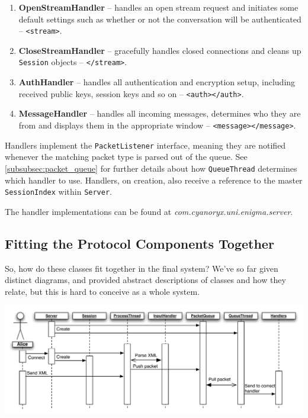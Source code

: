     \begin{enumerate}
      \item \textbf{OpenStreamHandler} -- handles an open stream request and initiates some default settings such as whether or not the conversation will be authenticated -- \verb!<stream>!.
      \item \textbf{CloseStreamHandler} -- gracefully handles closed connections and cleans up \verb!Session! objects -- \verb!</stream>!.
      \item \textbf{AuthHandler} -- handles all authentication and encryption setup, including received public keys, session keys and so on -- \verb!<auth></auth>!.
      \item \textbf{MessageHandler} -- handles all incoming messages, determines who they are from and displays them in the appropriate window -- \verb!<message></message>!.
    \end{enumerate}
    
    Handlers implement the \verb!PacketListener! interface, meaning they are notified whenever the matching packet type is parsed out of the queue. See \textsection\ref{subsubsec:packet_queue} for further details about how \verb!QueueThread! determines which handler to use. Handlers, on creation, also receive a reference to the master \verb!SessionIndex! within \verb!Server!.
    
    The handler implementations can be found at \emph{com.cyanoryx.uni.enigma.server}.
    
    \subsection{Fitting the Protocol Components Together}
    \label{subsec:combined}
    
    So, how do these classes fit together in the final system? We've so far given distinct diagrams, and provided abstract descriptions of classes and how they relate, but this is hard to conceive as a whole system.
    
    \begin{center}
      \includegraphics[scale=0.5]{./Figures/Ch6/6-4-5.pdf}
    \end{center}
    
